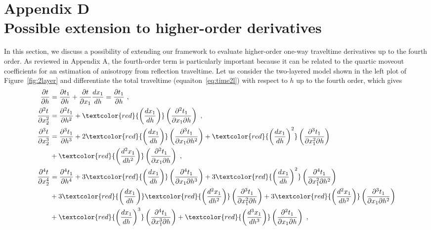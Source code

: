 \section{Appendix D \\ Possible extension to higher-order derivatives}
\label{sec:appd}
In this section, we discuss a possibility of extending our framework to evaluate higher-order one-way traveltime derivatives up to the fourth order. As reviewed in Appendix A, the fourth-order term is particularly important because it can be related to the quartic moveout coefficients for an estimation of anisotropy from reflection traveltime. Let us consider the two-layered model shown in the left plot of Figure~\ref{fig:2layer} and differentiate the total traveltime (equaiton~\ref{eq:time2l}) with respect to $h$ up to the fourth order, which gives
\begin{align}
\frac{\partial t}{\partial h} & = \frac{\partial t_1}{\partial h} +  \frac{\partial t}{\partial x_1}  \frac{d x_1}{d h}   = \frac{\partial t_1}{\partial h}~, \\
\frac{\partial^2 t}{\partial x^2_2} & = \frac{\partial^2 t_1}{\partial h^2} + \textcolor{red}{\left( \frac{d x_1}{d h}\right)} \left(\frac{\partial^2 t_1}{\partial x_1 \partial h} \right) ~, \\
\nonumber
\frac{\partial^3 t}{\partial x^3_2} & = \frac{\partial^3 t_1}{\partial h^3} +  2\textcolor{red}{\left( \frac{d x_1}{d h}\right)} \left(\frac{\partial^3 t_1}{\partial x_1 \partial h^2} \right) +  \textcolor{red}{\left( \frac{d x_1}{d h}\right)^2} \left(\frac{ \partial^3 t_1}{\partial x_1^2 \partial h} \right)  \\
& +  \textcolor{red}{\left( \frac{d ^2x_1}{d h^2}\right)} \left(\frac{ \partial^2 t_1}{\partial x_1 \partial h} \right) ~, \\
\nonumber
\frac{\partial^4 t}{\partial x^4_2} & = \frac{\partial^4 t_1}{\partial h^4} + 3 \textcolor{red}{\left( \frac{d x_1}{d h}\right)} \left(\frac{\partial^4 t_1}{\partial x_1 \partial h^3} \right) +  3\textcolor{red}{\left( \frac{d x_1}{d h}\right)^2} \left(\frac{ \partial^4 t_1}{\partial x_1^2 \partial h^2} \right) \\
\nonumber
& +  3\textcolor{red}{\left( \frac{d x_1}{d h}\right)} \textcolor{red}{\left( \frac{d^2 x_1}{d h^2}\right)} \left(\frac{ \partial^3 t_1}{\partial x_1^2 \partial h} \right) +  3\textcolor{red}{\left( \frac{d^2 x_1}{d h^2}\right)} \left(\frac{ \partial^3 t_1}{\partial x_1 \partial h^2} \right) \\
& + \textcolor{red}{\left( \frac{d x_1}{d h}\right)^3} \left(\frac{\partial^4 t_1}{\partial x_1^3 \partial h} \right) +  \textcolor{red}{\left( \frac{d^3 x_1}{d h^3}\right)} \left(\frac{\partial^2 t_1}{\partial x_1 \partial h} \right)~,
\end{align}
